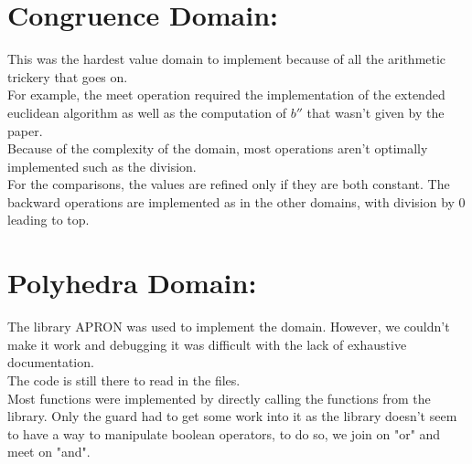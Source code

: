 \documentclass{article}
\begin{document}
\section{Congruence Domain:}
This was the hardest value domain to implement because of all the arithmetic trickery that goes on.\\
For example, the meet operation required the implementation of the extended euclidean algorithm as well as the computation of $b''$ that wasn't given by the paper.\\
Because of the complexity of the domain, most operations aren't optimally implemented such as the division.\\
For the comparisons, the values are refined only if they are both constant. The backward operations are implemented as in the other domains, with division by 0 leading to top.

\section{Polyhedra Domain:}
The library APRON was used to implement the domain. However, we couldn't make it work and debugging it was difficult with the lack of exhaustive documentation. \\
The code is still there to read in the files.\\
Most functions were implemented by directly calling the functions from the library. Only the guard had to get some work into it as the library doesn't seem to have a way to manipulate boolean operators, to do so, we join on "or" and meet on "and".
\end{document}
